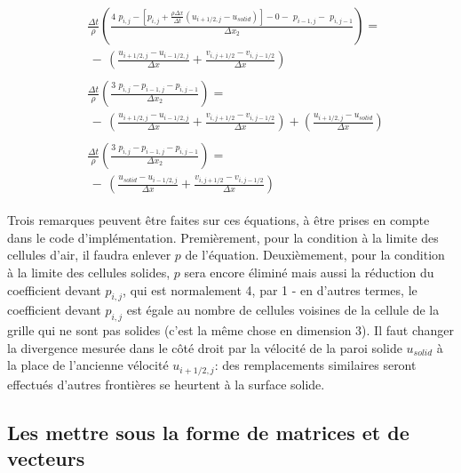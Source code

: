 \documentclass[11pt]{report}
\begin{document}
\begin{eqnarray}
&\begin{array}{c}
 \frac{\Delta t}{\rho}
\left(
	 \frac{4 \,\, p_{i,j} - 
	 \left[ 
	 	p_{i,j} + \frac{\rho\Delta x}{\Delta t}
	 	\left(
	 		u_{i+1/2,j} - u_{solid}
	 	\right)
	 \right] 
	 - 0- \,\, p_{i-1,j} - \,\, p_{i,j-1}}
	 {\Delta x_2}
\right) = \\ \, - \,	 
\left(
	\frac{u_{i+1/2,j} - u_{i-1/2,j}}
	{\Delta x} + 
	\frac{v_{i,j+1/2} - v_{i,j-1/2}}
	{\Delta x}
\right)
\end{array} \\
&\begin{array}{c}
\frac{\Delta t}{\rho}
\left(
	 \frac{3 \,\, p_{i,j} - p_{i-1,j} - p_{i,j-1}}
	 {\Delta x_2}
\right) = \\ \, - \,	 
\left(
	\frac{u_{i+1/2,j} - u_{i-1/2,j}}
	{\Delta x} + 
	\frac{v_{i,j+1/2} - v_{i,j-1/2}}
	{\Delta x}
\right) +
\left(
	\frac{u_{i+1/2,j} - u_{solid}}{\Delta x}
\right)
\end{array}\\
&\begin{array}{c}
\frac{\Delta t}{\rho}
\left(
	 \frac{3 \,\, p_{i,j} - p_{i-1,j} - p_{i,j-1}}
	 {\Delta x_2}
\right) = \\ \, - \,	 
\left(
	\frac{u_{solid} - u_{i-1/2,j}}
	{\Delta x} + 
	\frac{v_{i,j+1/2} - v_{i,j-1/2}}
	{\Delta x}
\right)
\end{array}
\end{eqnarray}

Trois remarques peuvent être faites sur ces équations, à être prises en compte dans le code d'implémentation. Premièrement, pour la condition à la limite des cellules d'air, il faudra enlever $p$ de l'équation. Deuxièmement, pour la condition à la limite des cellules solides, $p$ sera encore éliminé mais aussi la réduction du coefficient devant $p_{i,j}$, qui est normalement 4, par 1 - en d'autres termes, le coefficient devant $p_{i,j}$ est égale au nombre de cellules voisines de la cellule de la grille qui ne sont pas solides (c'est la même chose en dimension 3). Il faut changer la divergence mesurée dans le côté droit par la vélocité de la paroi solide $u_{solid}$ à la place de l'ancienne vélocité $u_{i+1/2,j}$: des remplacements similaires seront effectués d'autres frontières se heurtent à la surface solide.

\subsection{Les mettre sous la forme de matrices et de vecteurs}
\end{document}
